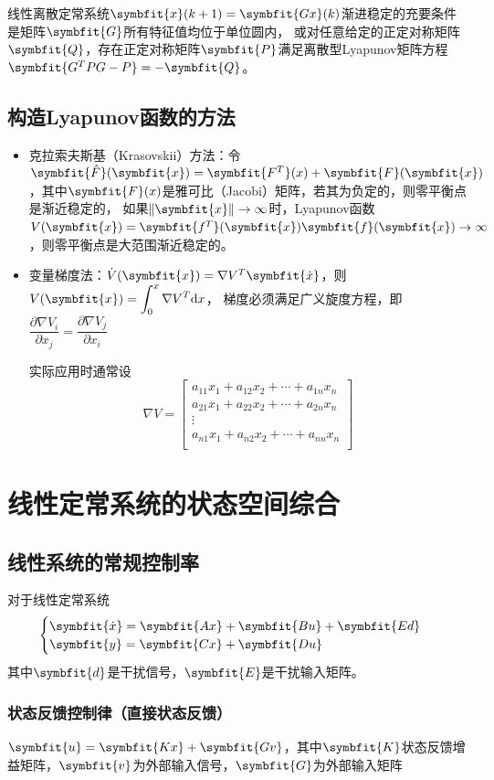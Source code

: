 \documentclass[11pt,a4paper]{ctexart}
\renewcommand{\d}{{\rm d}}
\newcommand{\bm}{\symbfit}
\begin{document}
        线性离散定常系统$\bm{x}(k+1)=\bm{Gx}(k)$渐进稳定的充要条件是矩阵$\bm{G}$所有特征值均位于单位圆内，
        或对任意给定的正定对称矩阵$\bm{Q}$，存在正定对称矩阵$\bm{P}$满足离散型Lyapunov矩阵方程$\bm{G^T PG-P}=-\bm{Q}$。
    \subsection{构造Lyapunov函数的方法}
        \begin{itemize}
            \item 克拉索夫斯基（Krasovskii）方法：令$\bm{\hat F}(\bm{x})=\bm{F^T}(x)+\bm{F}(\bm{x})$，其中$\bm{F}(x)$是雅可比（Jacobi）矩阵，若其为负定的，则零平衡点是渐近稳定的，
            如果$\|\bm{x}\|\rightarrow\infty$时，Lyapunov函数$V(\bm{x})=\bm{f^T}(\bm{x})\bm{f}(\bm{x})\rightarrow\infty$，则零平衡点是大范围渐近稳定的。
            \item 变量梯度法：$\dot V(\bm{x})=\nabla V^T\bm{\dot x}$，则$\displaystyle V(\bm{x})=\int_0^x\nabla V^T\d x$，
            梯度必须满足广义旋度方程，即$\dfrac{\partial \nabla V_i}{\partial x_j}=\dfrac{\partial \nabla V_j}{\partial x_i}$

            实际应用时通常设
            \[\nabla V=
            \begin{bmatrix}
            a_{11}x_1+a_{12}x_2+\cdots+a_{1n}x_n\\
            a_{21}x_1+a_{22}x_2+\cdots+a_{2n}x_n\\
            \vdots\\
            a_{n1}x_1+a_{n2}x_2+\cdots+a_{nn}x_n\\
            \end{bmatrix}
            \]
        \end{itemize}
\newpage
\section{线性定常系统的状态空间综合}
    \subsection{线性系统的常规控制率}
        对于线性定常系统
        \[
        \begin{cases}
        \bm{\dot{x}}=\bm{Ax}+\bm{Bu}+\bm{Ed}\\
        \bm{y}=\bm{Cx}+\bm{Du}
        \end{cases}
        \]
        其中$\bm{d}$是干扰信号，$\bm{E}$是干扰输入矩阵。

        \subsubsection{状态反馈控制律（直接状态反馈）}
            $\bm{u}=\bm{Kx}+\bm{Gv}$，其中$\bm{K}$状态反馈增益矩阵，$\bm{v}$为外部输入信号，$\bm{G}$为外部输入矩阵
\end{document}
